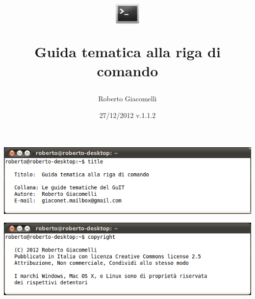 \documentclass[b5paper,11pt,openany]{guidatematica}
\title{%
\includegraphics[width=0.1\textwidth]{image/terminal-icon}%
\par Guida tematica alla riga di comando}
\author{Roberto Giacomelli}
\date{27/12/2012 v.1.1.2}
\begin{document}
\frontmatter
\maketitle
\rule{0pt}{1pt}

\vfill

\noindent\includegraphics[width=\textwidth]{image/title}

\bigskip
\noindent\includegraphics[width=\textwidth]{image/copyright}

\bigskip
\scalebox{1.6}{\cc \ccby \ccnc \ccsa}
\newpage
\tableofcontents
\newpage



\mainmatter









\backmatter

\end{document}
